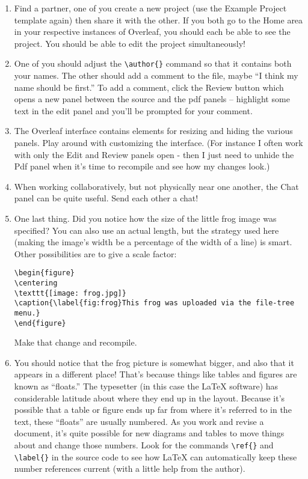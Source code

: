 \begin{enumerate}
\item Find a partner, one of you create a new project (use the Example Project template again) then share it with the other.  If you both go to the Home area in your respective instances of Overleaf, you should each be able to see the project.  You should be able to edit the project simultaneously!  
\item One of you should adjust the \verb+\author{}+ command so that it contains both your names.  The other should add a comment to the file, maybe ``I think my name should be first.''  To add a comment, click the Review button which opens a new panel between the source and the pdf panels -- highlight some text in the edit panel and you'll be prompted for your comment.
\item The Overleaf interface contains elements for resizing and hiding the various panels.  Play around with customizing the interface.  (For instance I often work with only the Edit and Review panels open - then I just need to unhide the Pdf panel when it's time to recompile and see how my changes look.)
\item When working collaboratively, but not physically near one another, the Chat panel can be quite useful.  Send each other a chat!
\item One last thing.  Did you notice how the size of the little frog image was specified?  You can also use an actual length, but the strategy used here (making the image's width be a percentage of the width of a line) is smart.  Other possibilities are to give a scale factor:

\begin{codeblock}
\begin{verbatim}
\begin{figure}
\centering
\texttt{[image: frog.jpg]}
\caption{\label{fig:frog}This frog was uploaded via the file-tree menu.}
\end{figure}
\end{verbatim}
\end{codeblock}

Make that change and recompile.

\item You should notice that the frog picture is somewhat bigger, and also that it appears in a different place!  That's because things like tables and figures are known as ``floats.''  The typesetter (in this case the \LaTeX{} software) has considerable latitude about where they end up in the layout.  Because it's possible that a table or figure ends up far from where it's referred to in the text, these ``floats'' are usually numbered.  As you work and revise a document, it's quite possible for new diagrams and tables to move things about and change those numbers.  Look for the commands \verb+\ref{}+ and \verb+\label{}+ in the source code to see how \LaTeX{} can automatically keep these number references current (with a little help from the author).


\end{enumerate}
